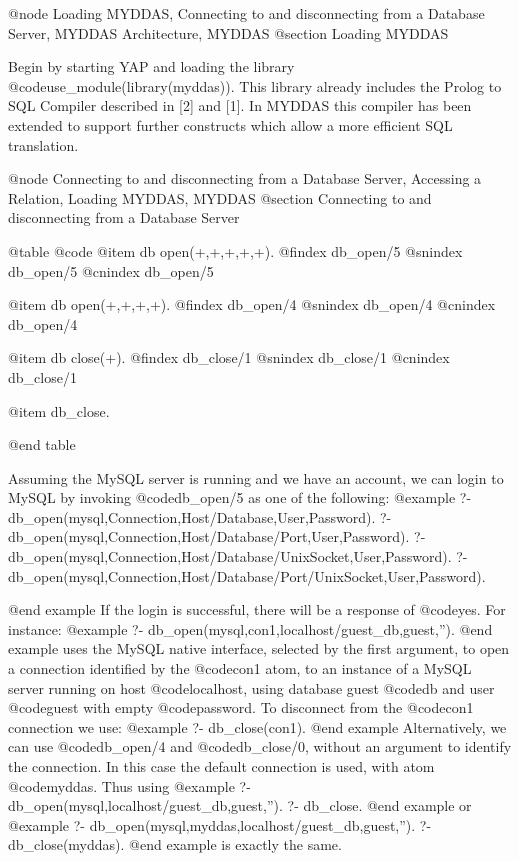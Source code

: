 {{{{{{{{{@node Loading MYDDAS, Connecting to and disconnecting from a Database Server, MYDDAS Architecture, MYDDAS 
@section Loading MYDDAS

Begin by starting YAP and loading the library
@code{use_module(library(myddas))}.  This library already includes the
Prolog to SQL Compiler described in [2] and [1]. In MYDDAS this compiler
has been extended to support further constructs which allow a more
efficient SQL translation.  

@node Connecting to and disconnecting from a Database Server, Accessing a Relation, Loading MYDDAS, MYDDAS
@section Connecting to and disconnecting from a Database Server


@table @code
@item db open(+,+,+,+,+). 
@findex db_open/5
@snindex db_open/5
@cnindex db_open/5

@item db open(+,+,+,+). 
@findex db_open/4
@snindex db_open/4
@cnindex db_open/4

@item db close(+). 
@findex db_close/1
@snindex db_close/1
@cnindex db_close/1

@item db_close.

@end table 

  Assuming the MySQL server is running and we have an account, we can
login to MySQL by invoking @code{db_open/5} as one of the following:
@example
?- db_open(mysql,Connection,Host/Database,User,Password). 
?- db_open(mysql,Connection,Host/Database/Port,User,Password).
?- db_open(mysql,Connection,Host/Database/UnixSocket,User,Password). 
?- db_open(mysql,Connection,Host/Database/Port/UnixSocket,User,Password).

@end example
If the login is successful, there will be a response of @code{yes}. For
instance:
 @example
?- db_open(mysql,con1,localhost/guest_db,guest,'').
@end example
uses the MySQL native interface, selected by the first argument, to open
a connection identified by the @code{con1} atom, to an instance of a
MySQL server running on host @code{localhost}, using database guest @code{db}
and user @code{guest} with empty @code{password}.  To disconnect from the @code{con1}
connection we use: 
@example
?- db_close(con1).
@end example
 Alternatively, we can use @code{db_open/4} and @code{db_close/0,} without an argument
to identify the connection. In this case the default connection is used,
with atom @code{myddas}. Thus using 
@example
?- db_open(mysql,localhost/guest_db,guest,''). 
?- db_close.  
@end example
or
@example
?- db_open(mysql,myddas,localhost/guest_db,guest,''). 
?- db_close(myddas). 
@end example
is exactly the same.

}}}}}}}}}
